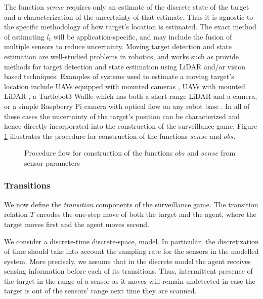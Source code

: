 The function $sense$ requires only an estimate of the discrete state of the target and a characterization of the uncertainty of that estimate. Thus it is agnostic to the specific methodology of how target's location is estimated. The exact method of estimating $l_t$ will be application-specific, and may include the fusion of multiple sensors to reduce uncertainty. Moving target detection and state estimation are well-studied problems in robotics, and works such as \cite{niazi2014,mendes2004,sun2016} provide methods for target detection and state estimation using LiDAR and/or vision based techniques. Examples of systems used to estimate a moving target's location include UAVs equipped with mounted cameras \cite{dobrokhodov2006vision,teuliere2011chasing}, UAVs with mounted LiDAR \cite{tulldahl2015accuracy}, a Turtlebot3 Waffle which has both a short-range LiDAR and a camera, or a simple Raspberry Pi camera with optical flow on any robot base \cite{kale2015}. In all of these cases the uncertainty of the target's position can be characterized and hence directly incorporated into the construction of the surveillance game. Figure \ref{fig:obsfunction} illustrates the procedure for construction of the functions $sense$ and $obs$.

\begin{figure}[h!]

    \caption{Procedure flow for construction of the functions $obs$ and $sense$ from sensor parameters}
    \label{fig:obsfunction}
\end{figure}


\subsubsection*{\textbf{Transitions}} We now define the \emph{transition} components of the surveillance game. 
The transition relation $T$ encodes the one-step move of both the target and the agent, where the target moves first and the agent moves second. 

We consider a discrete-time discrete-space, model. In particular, the discretization of time should take into account the sampling rate for the sensors in the modelled system. More precisely, we assume that in the discrete model the agent receives sensing information before each of its transitions. Thus, intermittent presence of the target in the range of a sensor as it moves will remain undetected in case the target is out of the sensors' range next time they are scanned.

